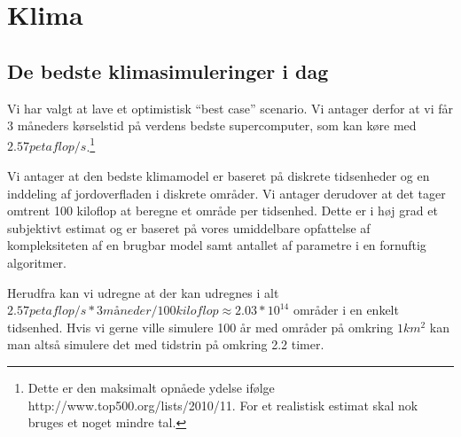 \section{Klima}

\subsection{De bedste klimasimuleringer i dag}
Vi har valgt at lave et optimistisk ``best case'' scenario. Vi antager
derfor at vi får 3 måneders kørselstid på verdens bedste supercomputer, som
kan køre med $2.57 petaflop/s$.\footnote{Dette er den maksimalt opnåede ydelse
ifølge http://www.top500.org/lists/2010/11. For et realistisk estimat skal nok
bruges et noget mindre tal.}

Vi antager at den bedste klimamodel er baseret på diskrete tidsenheder og en
inddeling af jordoverfladen i diskrete områder. Vi antager derudover at
det tager omtrent 100 kiloflop at beregne et område per tidsenhed. Dette er i
høj grad et subjektivt estimat og er baseret på vores umiddelbare opfattelse af
kompleksiteten af en brugbar model samt antallet af parametre i en fornuftig algoritmer.

Herudfra kan vi udregne at der kan udregnes i alt $2.57 petaflop/s * 3 måneder /
100 kiloflop \approx 2.03*10^14$ områder i en enkelt tidsenhed. Hvis vi gerne
ville simulere 100 år med områder på omkring $1 km^2$ kan man altså simulere det
med tidstrin på omkring 2.2 timer.
